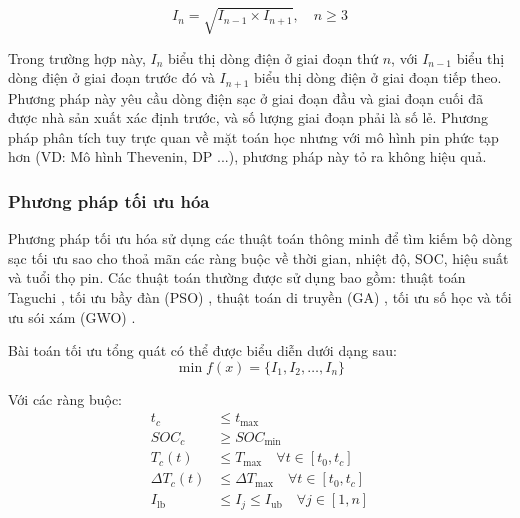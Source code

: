 \documentclass{thesis}
\begin{document}
\begin{equation}
\label{eq:RC}
I_n = \sqrt{I_{n-1} \times I_{n+1}}, \quad n \geq 3
\end{equation}

Trong trường hợp này, \( I_n \) biểu thị dòng điện ở giai đoạn thứ \( n \), với \( I_{n-1} \) biểu thị dòng điện ở giai đoạn trước đó và \( I_{n+1} \) biểu thị dòng điện ở giai đoạn tiếp theo. Phương pháp này yêu cầu dòng điện sạc ở giai đoạn đầu và giai đoạn cuối đã được nhà sản xuất xác định trước, và số lượng giai đoạn phải là số lẻ. Phương pháp phân tích tuy trực quan về mặt toán học nhưng với mô hình pin phức tạp hơn (VD: Mô hình Thevenin, DP ...), phương pháp này tỏ ra không hiệu quả. 


\subsubsection{Phương pháp tối ưu hóa}

Phương pháp tối ưu hóa sử dụng các thuật toán thông minh để tìm kiếm bộ dòng sạc tối ưu sao cho thoả mãn các ràng buộc về thời gian, nhiệt độ, SOC, hiệu suất và tuổi thọ pin. Các thuật toán thường được sử dụng bao gồm: thuật toán Taguchi \cite{ref30,ref47}, tối ưu bầy đàn (PSO) \cite{ref68,ref80}, thuật toán di truyền (GA) \cite{ref73}, tối ưu số học \cite{ref92} và tối ưu sói xám (GWO) \cite{ref52}.

Bài toán tối ưu tổng quát có thể được biểu diễn dưới dạng sau:
\begin{equation}
\label{eq:objective}
\min f(x) = \{I_1, I_2, \dots, I_n\}
\end{equation}

Với các ràng buộc:
\begin{align}
t_c &\leq t_{\text{max}} \label{eq:time_constraint} \\
SOC_c &\geq SOC_{\text{min}} \label{eq:soc_constraint} \\
T_c(t) &\leq T_{\text{max}} \quad \forall t \in [t_0, t_c] \label{eq:temp_constraint} \\
\Delta T_c(t) &\leq \Delta T_{\text{max}} \quad \forall t \in [t_0, t_c] \label{eq:deltatemp_constraint} \\
I_{\text{lb}} &\leq I_j \leq I_{\text{ub}} \quad \forall j \in [1, n] \label{eq:current_constraint}
\end{align}
\end{document}
